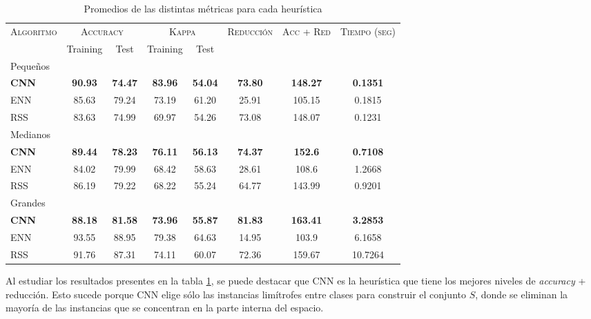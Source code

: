 \begin{table}[h!]
\centering
\begin{adjustbox}{max width =\textwidth}
\begin{tabular}{l c c c c c c c}
\hline
\multirow{2}{*}{\textsc{Algoritmo}}
	& \multicolumn{2}{c}{\textsc{Accuracy}}
	& \multicolumn{2}{c}{\textsc{Kappa}}
	& \textsc{Reducción}
	& \textsc{Acc + Red}
	& \textsc{Tiempo (seg)} \\
	& Training & Test
	& Training & Test \\ 
\hline
\hline

Pequeños\\
\textbf{CNN} & \textbf{90.93} & \textbf{74.47} & \textbf{83.96} & \textbf{54.04} & \textbf{73.80} & \textbf{148.27} & \textbf{0.1351} \\
ENN & 85.63 & 79.24 & 73.19 & 61.20 & 25.91 & 105.15 & 0.1815 \\
RSS & 83.63 & 74.99 & 69.97 & 54.26 & 73.08 & 148.07 & 0.1231 \\

\hline

Medianos\\
\textbf{CNN} & \textbf{89.44} & \textbf{78.23} & \textbf{76.11} & \textbf{56.13} & \textbf{74.37} & \textbf{152.6} & \textbf{0.7108} \\
ENN & 84.02 & 79.99 & 68.42 & 58.63 & 28.61 & 108.6 & 1.2668 \\
RSS & 86.19 & 79.22 & 68.22 & 55.24 & 64.77 & 143.99 & 0.9201 \\

\hline

Grandes\\
\textbf{CNN} & \textbf{88.18} & \textbf{81.58} & \textbf{73.96} & \textbf{55.87} & \textbf{81.83} & \textbf{163.41} & \textbf{3.2853} \\
ENN & 93.55 & 88.95 & 79.38 & 64.63 & 14.95 & 103.9 & 6.1658 \\
RSS & 91.76 & 87.31 & 74.11 & 60.07 & 72.36 & 159.67 & 10.7264 \\


\hline
\end{tabular}
\end{adjustbox}
\caption{Promedios de las distintas métricas para cada heurística}
\label{heu}
\end{table}

Al estudiar los resultados presentes en la tabla \ref{heu}, se puede destacar que CNN es la heurística que tiene los mejores niveles de \emph{accuracy} + reducción. Esto sucede porque CNN elige sólo las instancias limítrofes entre clases para construir el conjunto $S$, donde se eliminan la mayoría de las instancias que se concentran en la parte interna del espacio.


